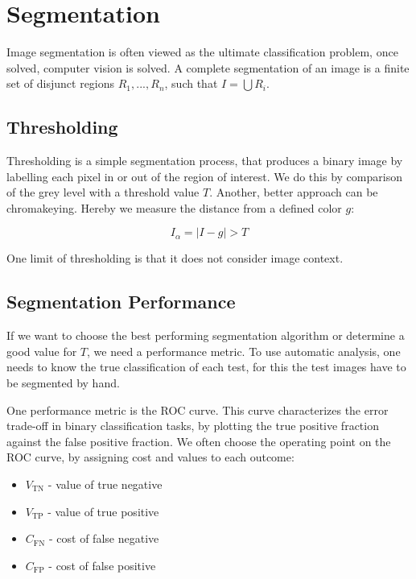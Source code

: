 \section{Segmentation}

Image segmentation is often viewed as the ultimate classification problem, once solved, computer vision is solved. A complete segmentation of an image is a finite set of disjunct regions $R_1, ..., R_n$, such that $I = \bigcup R_i$.


\subsection{Thresholding}

Thresholding is a simple segmentation process, that produces a binary image by labelling each pixel in or out of the region of interest. We do this by comparison of the grey level with a threshold value $T$. Another, better approach can be chromakeying. Hereby we measure the distance from a defined color $g$:

$$I_\alpha = |I - g| > T$$

One limit of thresholding is that it does not consider image context.


\subsection{Segmentation Performance}

If we want to choose the best performing segmentation algorithm or determine a good value for $T$, we need a performance metric. To use automatic analysis, one needs to know the true classification of each test, for this the test images have to be segmented by hand. \medskip

One performance metric is the ROC curve. This curve characterizes the error trade-off in binary classification tasks, by plotting the true positive fraction against the false positive fraction. We often choose the operating point on the ROC curve, by assigning cost and values to each outcome:
\begin{itemize}
	\item $V_{\text{TN}}$ - value of true negative
	\item $V_{\text{TP}}$ - value of true positive
	\item $C_{\text{FN}}$ - cost of false negative
	\item $C_{\text{FP}}$ - cost of false positive
\end{itemize}

